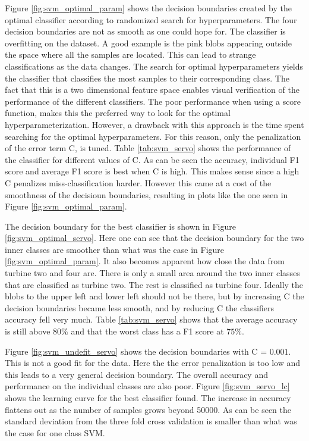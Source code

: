             Figure \ref{fig:svm_optimal_param} shows the decision boundaries created by the optimal classifier according to randomized search for hyperparameters. The four decision boundaries are not as smooth as one could hope for. The classifier is overfitting on the dataset. A good example is the pink blobs appearing outside the space where all the samples are located. This can lead to strange classifications as the data changes. The search for optimal hyperparameters yields the classifier that classifies the most samples to their corresponding class. The fact that this is a two dimensional feature space enables visual verification of the performance of the different classifiers. The poor performance when using a score function, makes this the preferred way to look for the optimal hyperparameterization. However, a drawback with this approach is the time spent searching for the optimal hyperparameters.  For this reason, only the penalization of the error term C, is tuned. Table \ref{tab:svm_servo} shows the performance of the classifier for different values of C. As can be seen the accuracy, individual F1 score and average F1 score is best when C is high. This makes sense since a high C penalizes miss-classification harder. However this came at a cost of the smoothness of the decisioun boundaries, resulting in plots like the one seen in Figure \ref{fig:svm_optimal_param}.  
            
            The decision boundary for the best classifier is shown in Figure \ref{fig:svm_optimal_servo}. Here one can see that the decision boundary for the two inner classes are smoother than what was the case in Figure \ref{fig:svm_optimal_param}. It also becomes apparent how close the data from turbine two and four are. There is only a small area around the two inner classes that are classified as turbine two. The rest is classified as turbine four. Ideally the blobs to the upper left and lower left should not be there, but by increasing C the decision boundaries became less smooth, and by reducing C the classifiers accuracy fell very much. Table \ref{tab:svm_servo} shows that the average accuracy is still above $80\%$ and that the worst class has a F1 score at $75\%$.  
            
            Figure \ref{fig:svm_undefit_servo} shows the decision boundaries with C = $0.001$. This is not a good fit for the data. Here the the error penalization is too low and this leads to a very general decision boundary. The overall accuracy and performance on the individual classes are also poor. Figure \ref{fig:svm_servo_lc} shows the learning curve for the best classifier found. The increase in accuracy flattens out as the number of samples grows beyond 50000. As can be seen the standard deviation from the three fold cross validation is smaller than what was the case for one class SVM.    
            
